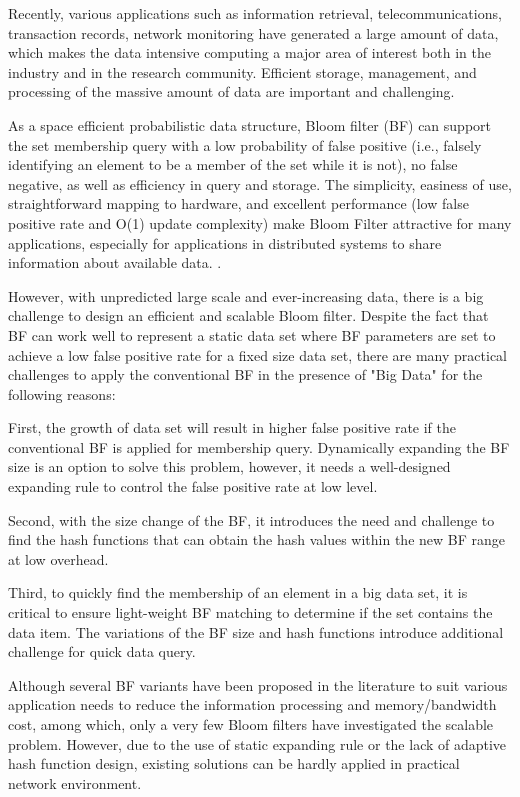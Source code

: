 \documentclass[10pt,journal,letterpaper]{IEEEtran}
\begin{document}
Recently, various applications such as information retrieval, telecommunications, transaction records, network monitoring have generated a large amount of data, which makes the data intensive computing a major area of interest both in the industry and in the research community. Efficient storage, management, and processing of the massive amount of data are important and challenging.

As a space efficient probabilistic data structure, Bloom filter (BF) \cite{bloom1970space} can support the set membership query with a low probability of false positive (i.e., falsely identifying an element to be a member of the set while it is not), no false negative, as well as efficiency in query and storage. The simplicity, easiness
of use, straightforward mapping to hardware, and excellent
performance (low false positive rate and O(1) update complexity) make Bloom Filter attractive for many applications,
especially for applications in distributed systems to share
information about available data. \cite{Broder2004,tarkoma2012theory}.

However, with unpredicted large scale and ever-increasing data, there is a big challenge to design an efficient and scalable Bloom filter.
Despite the fact that BF can work well to represent a static data set where BF parameters are set to achieve a low false positive rate for a fixed size data set, there are many practical challenges to apply the conventional BF in the presence of "Big Data" for the following reasons:


First, the growth of data set will result in higher false positive rate if the conventional BF is applied for membership query. Dynamically expanding the BF size is an option to solve this problem, however, it needs a well-designed expanding rule to control the false positive rate at low level.

Second, with the size change of the BF, it introduces the need and challenge to find the hash functions that can obtain the hash values within the new BF range at low overhead.

Third, to quickly find the membership of an element in a big data set, it is critical to ensure light-weight BF matching to determine if the set contains the data item. The variations of the BF size and hash functions introduce additional challenge for quick data query.

Although several BF variants \cite{6848046,fan2000summary,mitzenmacher2002compressed,kumar2006space,deng2006approximately,dutta2012towards,dutta2013streaming,yoon2010aging,tree6848077,guo2006theory, xie2007scalable} have been proposed in the literature to suit
various application needs to reduce the information processing and memory/bandwidth cost,
among which, only a very few Bloom filters \cite{guo2006theory, wei2010mad2,almeida2007scalable,xie2007scalable} have investigated the scalable problem. However, due to the use of static expanding rule or the lack of adaptive hash function design, existing solutions can be hardly  applied in practical network environment.
\end{document}
